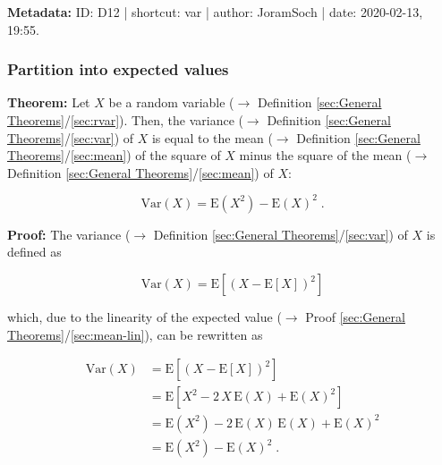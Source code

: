 \documentclass[a4paper,12pt,twoside]{book}
\begin{document}
\vspace{1em}
\textbf{Metadata:} ID: D12 | shortcut: var | author: JoramSoch | date: 2020-02-13, 19:55.
\vspace{1em}



\subsubsection[\textbf{Partition into expected values}]{Partition into expected values} \label{sec:var-mean}
\setcounter{equation}{0}

\textbf{Theorem:} Let $X$ be a random variable ($\rightarrow$ Definition \ref{sec:General Theorems}/\ref{sec:rvar}). Then, the variance ($\rightarrow$ Definition \ref{sec:General Theorems}/\ref{sec:var}) of $X$ is equal to the mean ($\rightarrow$ Definition \ref{sec:General Theorems}/\ref{sec:mean}) of the square of $X$ minus the square of the mean ($\rightarrow$ Definition \ref{sec:General Theorems}/\ref{sec:mean}) of $X$:

\begin{equation} \label{eq:var-mean-var-mean}
\mathrm{Var}(X) = \mathrm{E}(X^2) - \mathrm{E}(X)^2 \; .
\end{equation}


\vspace{1em}
\textbf{Proof:} The variance ($\rightarrow$ Definition \ref{sec:General Theorems}/\ref{sec:var}) of $X$ is defined as

\begin{equation} \label{eq:var-mean-var}
\mathrm{Var}(X) = \mathrm{E}\left[ \left( X - \mathrm{E}[X] \right)^2 \right]
\end{equation}

which, due to the linearity of the expected value ($\rightarrow$ Proof \ref{sec:General Theorems}/\ref{sec:mean-lin}), can be rewritten as

\begin{equation} \label{eq:var-mean-var-mean-qed}
\begin{split}
\mathrm{Var}(X) &= \mathrm{E}\left[ \left( X - \mathrm{E}[X] \right)^2 \right] \\
&= \mathrm{E}\left[ X^2 - 2 \, X \, \mathrm{E}(X) + \mathrm{E}(X)^2 \right] \\
&= \mathrm{E}(X^2) - 2 \, \mathrm{E}(X) \, \mathrm{E}(X) + \mathrm{E}(X)^2 \\
&= \mathrm{E}(X^2) - \mathrm{E}(X)^2 \; .
\end{split}
\end{equation}
\end{document}
